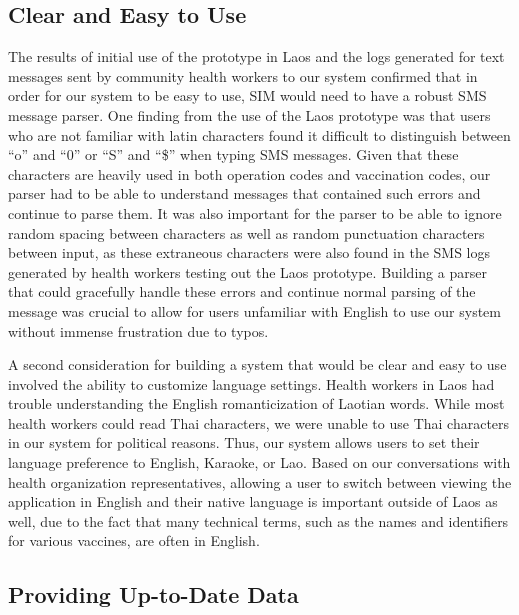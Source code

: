 \documentclass{acm_proc_article-sp}
\begin{document}
\subsection{Clear and Easy to Use}

The results of initial use of the prototype in Laos and the logs generated for text messages sent by community health workers to our system confirmed that in order for our system to be easy to use, SIM would need to have a robust SMS message parser. One finding from the use of the Laos prototype was that users who are not familiar with latin characters found it difficult to distinguish between “o” and “0” or “S” and “\$” when typing SMS messages. Given that these characters are heavily used in both operation codes and vaccination codes, our parser had to be able to understand messages that contained such errors and continue to parse them. It was also important for the parser to be able to ignore random spacing between characters as well as random punctuation characters between input, as these extraneous characters were also found in the SMS logs generated by health workers testing out the Laos prototype. Building a parser that could gracefully handle these errors and continue normal parsing of the message was crucial to allow for users unfamiliar with English to use our system without immense frustration due to typos.

A second consideration for building a system that would be clear and easy to use involved the ability to customize language settings. Health workers in Laos had trouble understanding the English romanticization of Laotian words. While most health workers could read Thai characters, we were unable to use Thai characters in our system for political reasons. Thus, our system allows users to set their language preference to English, Karaoke, or Lao. Based on our conversations with health organization representatives, allowing a user to switch between viewing the application in English and their native language is important outside of Laos as well, due to the fact that many technical terms, such as the names and identifiers for various vaccines, are often in English.

\subsection{Providing Up-to-Date Data}
\end{document}
